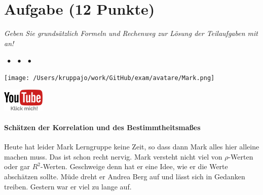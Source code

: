 \documentclass[a4paper, 9pt]{scrartcl}\usepackage[]{graphicx}\usepackage[]{xcolor}
\begin{document}
\clearpage

\section{Aufgabe \hfill (12 Punkte)}

\textit{Geben Sie grundsätzlich Formeln und Rechenweg zur Lösung der Teilaufgaben mit an!} \\[1Ex]
 

 
\ifcollection
\begin{flushright}
\tiny\vspace{-3Ex}
\textbf{\examinhaltstart}
\exammodulestat $\;\bullet$
\exammodulestatbbv $\;\bullet$
\exammodulestatversuch $\;\bullet$
\exammodulebiostat
\vspace{-4Ex}
\end{flushright}
\begin{minipage}[t]{0.5\textwidth}
\texttt{[image: /Users/kruppajo/work/GitHub/exam/avatare/Mark.png]}
\end{minipage}
\begin{minipage}[t]{0.5\textwidth}
\hfill
\href{https://youtu.be/2QJa19ZwLls}{\includegraphics[width = 2cm]{img/youtube}}
\end{minipage}
\vspace{-3ex}
\fi



\ifcollection
\paragraph{Schätzen der Korrelation und des Bestimmtheitsmaßes}
\fi

Heute hat leider Mark Lerngruppe keine Zeit, so dass dann Mark alles hier alleine machen muss. Das ist schon recht nervig. Mark versteht nicht viel von $\rho$-Werten oder gar $R^2$-Werten. Geschweige denn hat er eine Idee, wie er die Werte abschätzen sollte. Müde dreht er Andrea Berg auf und lässt sich in Gedanken treiben. Gestern war er viel zu lange auf.
\vspace{2Ex}
\end{document}
